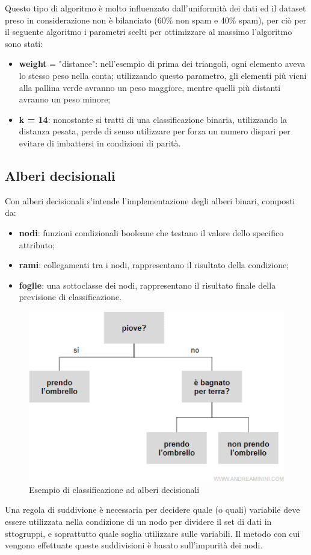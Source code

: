 \documentclass[12pt,a4paper]{article}
\begin{document}
Questo tipo di algoritmo è molto influenzato dall'uniformità dei dati ed il dataset preso in considerazione non è bilanciato (60\% non spam e 40\% spam), per ciò per il seguente algoritmo i parametri scelti per ottimizzare al massimo l'algoritmo sono stati:
\begin{itemize}
    \item \textbf{weight} = "distance": nell'esempio di prima dei triangoli, ogni elemento aveva lo stesso peso nella conta; utilizzando questo parametro, gli elementi più vicni alla pallina verde avranno un peso maggiore, mentre quelli più distanti avranno un peso minore;
    \item \textbf{k = 14}: nonostante si tratti di una classificazione binaria, utilizzando la distanza pesata, perde di senso utilizzare per forza un numero dispari per evitare di imbattersi in condizioni di parità.
\end{itemize}

\subsection{Alberi  decisionali}
Con alberi decisionali s'intende l'implementazione degli alberi binari, composti da:
\begin{itemize}
    \item \textbf{nodi}: funzioni condizionali booleane che testano il valore dello specifico attributo;
    \item \textbf{rami}: collegamenti tra i nodi, rappresentano il risultato della condizione;
    \item \textbf{foglie}: una sottoclasse dei nodi, rappresentano il risultato finale della previsione di classificazione.
\end{itemize}

\begin{figure}[h]
    \centering
    \includegraphics[width=.5\columnwidth]{decision_tree.png}
    \caption{Esempio di classificazione ad alberi decisionali}
\end{figure}
Una regola di suddivione è necessaria per decidere quale (o quali) variabile deve essere utilizzata nella condizione di un nodo per dividere il set di dati in sttogruppi, e soprattutto quale soglia utilizzare sulle variabili. Il metodo con cui vengono effettuate queste suddivisioni è basato sull'impurità dei nodi.
\end{document}
